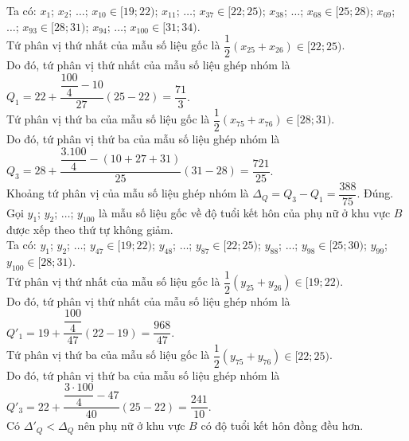 \begin{ex}
{\begin{itemchoice}
			Ta có: $x_1$; $x_2$; $\ldots$; $x_{10}\in[19; 22)$; $x_{11}$; $\ldots$; $x_{37}\in[22;25)$; $x_{38}$; $\ldots$; $x_{68}\in[25; 28)$; $x_{69}$; $\ldots$; $x_{93}\in[28; 31)$; $x_{94}$; $\ldots$; $x_{100}\in[31; 34)$.\\
			Tứ phân vị thứ nhất của mẫu số liệu gốc là $\dfrac{1}{2}\left(x_{25}+x_{26}\right)\in[22;25)$.\\
			Do đó, tứ phân vị thứ nhất của mẫu số liệu ghép nhóm là\\ $Q_1=22+\dfrac{\dfrac{100}{4}-10}{27}(25-22)=\dfrac{71}{3}$.\\
			Tứ phân vị thứ ba của mẫu số liệu gốc là $\dfrac{1}{2}\left(x_{75}+x_{76}\right)\in[28;31)$.\\
			Do đó, tứ phân vị thứ ba của mẫu số liệu ghép nhóm là\\ $Q_3=28+\dfrac{\dfrac{3.100}{4}-(10+27+31)}{25}(31-28)=\dfrac{721}{25}$.\\
			Khoảng tứ phân vị của mẫu số liệu ghép nhóm là $\Delta_Q=Q_3-Q_1=\dfrac{388}{75}$.
			\itemch Đúng. Gọi $y_1$; $y_2$; $\ldots$; $y_{100}$ là mẫu số liệu gốc về độ tuổi kết hôn của phụ nữ ở khu vực $B$ được xếp theo thứ tự không giảm.\\
			Ta có: $y_1$; $y_2$; $\ldots$; $y_{47}\in[19; 22)$; $y_{48}$; $\ldots$; $y_{87}\in[22; 25)$; $y_{88}$; $\ldots$; $y_{98}\in[25; 30)$; $y_{99}$; $y_{100}\in[28; 31)$.\\
			Tứ phân vị thứ nhất của mẫu số liệu gốc là $\dfrac{1}{2}\left(y_{25}+y_{26}\right)\in[19; 22)$.\\
			Do đó, tứ phân vị thứ nhất của mẫu số liệu ghép nhóm là\\ $Q'_1=19+\dfrac{\dfrac{100}{4}}{47}(22-19)=\dfrac{968}{47}$.\\
			Tứ phân vị thứ ba của mẫu số liệu gốc là $\dfrac{1}{2}\left(y_{75}+y_{76}\right)\in[22;25)$.\\
			Do đó, tứ phân vị thứ ba của mẫu số liệu ghép nhóm là\\ $Q'_3=22+\dfrac{\dfrac{3\cdot 100}{4}-47}{40}(25-22)=\dfrac{241}{10}$.\\
			Có $\Delta'_Q < \Delta_Q$ nên phụ nữ ở khu vực $B$ có độ tuổi kết hôn đồng đều hơn.
		\end{itemchoice}
	}
\end{ex}

